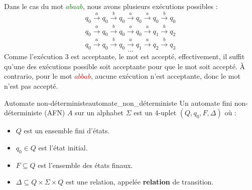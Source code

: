 \begin{example}
\begin{figure}[H]
    \end{figure}
    Dans le cas du mot \textcolor{green}{$abaab$}, nous avons plusieurs exécutions possibles :
    \begin{equation*}
        q_0 \xrightarrow[]{a} q_0 \xrightarrow[]{b} q_0 \xrightarrow[]{a} q_0 \xrightarrow[]{a} q_0 \xrightarrow[]{b} q_0
    \end{equation*}
    \begin{equation*}
        q_0 \xrightarrow[]{a} q_0 \xrightarrow[]{b} q_0 \xrightarrow[]{a} q_0 \xrightarrow[]{a} q_1 \xrightarrow[]{b} q_2
    \end{equation*}
    \begin{equation*}
        q_0 \xrightarrow[]{a} q_0 \xrightarrow[]{b} q_0 \xrightarrow[]{a} q_1 \xrightarrow[]{a} q_2 \xrightarrow[]{b} q_3
    \end{equation*}
    \begin{equation*}
        \dots  
    \end{equation*}
    Comme l'exécution 3 est acceptante, le mot est accepté, effectivement, il suffit qu'une des exécutions possible soit 
    acceptante pour que le mot soit accepté. À contrario, pour le mot \textcolor{red}{$abbab$}, aucune exécution n'est
    acceptante, donc le mot n'est pas accepté.
\end{example}
\begin{definition}{Automate non-déterministe}{automate_non_déterministe}
    Un automate fini non-déterministe (AFN) $A$ sur un alphabet $\Sigma$ est un 4-uplet $(Q, q_0, F, \Delta)$ où :
    \begin{itemize}[label=\textbullet]
        \item $Q$ est un ensemble fini d'états.
        \item $q_0 \in Q$ est l'état initial.
        \item $F \subseteq Q$ est l'ensemble des états finaux.
        \item $\Delta \subseteq Q \times \Sigma \times Q$ est une relation, appelée \textbf{relation} de transition.
    \end{itemize}
\end{definition}
